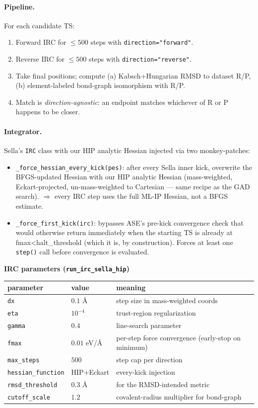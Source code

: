 \documentclass[11pt]{article}
\begin{document}
\paragraph{Pipeline.} For each candidate TS:
\begin{enumerate}[leftmargin=1.5em]
\item Forward IRC for $\le 500$ steps with \texttt{direction="forward"}.
\item Reverse IRC for $\le 500$ steps with \texttt{direction="reverse"}.
\item Take final positions; compute (a) Kabsch+Hungarian RMSD to
  dataset R/P, (b) element-labeled bond-graph isomorphism with R/P.
\item Match is \emph{direction-agnostic}: an endpoint matches whichever
  of R or P happens to be closer.
\end{enumerate}

\paragraph{Integrator.} Sella's \texttt{IRC} class with our HIP analytic
Hessian injected via two monkey-patches:
\begin{itemize}[leftmargin=1.5em]
\item \texttt{\_force\_hessian\_every\_kick(pes)}: after every Sella inner
  kick, overwrite the BFGS-updated Hessian with our HIP analytic Hessian
  (mass-weighted, Eckart-projected, un-mass-weighted to Cartesian — same
  recipe as the GAD search). $\Rightarrow$ every IRC step uses the full
  ML-IP Hessian, not a BFGS estimate.
\item \texttt{\_force\_first\_kick(irc)}: bypasses ASE's pre-kick
  convergence check that would otherwise return immediately when the
  starting TS is already at fmax<halt\_threshold (which it is, by
  construction). Forces at least one \texttt{step()} call before
  convergence is evaluated.
\end{itemize}

\begin{center}\small
\textbf{IRC parameters (\texttt{run\_irc\_sella\_hip})} \\[0.3em]
\begin{tabular}{lll}
\toprule
parameter & value & meaning \\
\midrule
\texttt{dx} & $0.1$ \AA & step size in mass-weighted coords \\
\texttt{eta} & $10^{-4}$ & trust-region regularization \\
\texttt{gamma} & $0.4$ & line-search parameter \\
\texttt{fmax} & $0.01$ eV/\AA & per-step force convergence (early-stop on minimum) \\
\texttt{max\_steps} & $500$ & step cap per direction \\
\texttt{hessian\_function} & HIP+Eckart & every-kick injection \\
\texttt{rmsd\_threshold} & $0.3$ \AA & for the RMSD-intended metric \\
\texttt{cutoff\_scale} & $1.2$ & covalent-radius multiplier for bond-graph \\
\bottomrule
\end{tabular}
\end{center}
\end{document}
